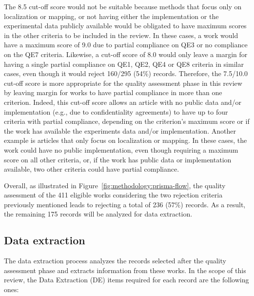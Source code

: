 The 8.5 cut-off score would not be suitable because methods that focus only on localization or mapping, or not having either the implementation or the experimental data publicly available would be obligated to have maximum scores in the other criteria to be included in the review. In these cases, a work would have a maximum score of 9.0 due to partial compliance on QE3 or no compliance on the QE7 criteria. Likewise, a cut-off score of 8.0 would only leave a margin for having a single partial compliance on QE1, QE2, QE4 or QE8 criteria in similar cases, even though it would reject 160/295 (54\%) records. Therefore, the 7.5/10.0 cut-off score is more appropriate for the quality assessment phase in this review by leaving margin for works to have partial compliance in more than one criterion. Indeed, this cut-off score allows an article with no public data and/or implementation (e.g., due to confidentiality agreements) to have up to four criteria with partial compliance, depending on the criterion's maximum score or if the work has available the experiments data and/or implementation. Another example is articles that only focus on localization or mapping. In these cases, the work could have no public implementation, even though requiring a maximum score on all other criteria, or, if the work has public data or implementation available, two other criteria could have partial compliance.

Overall, as illustrated in Figure~\ref{fig:methodology:prisma-flow}, the quality assessment of the 411 eligible works considering the two rejection criteria previously mentioned leads to rejecting a total of 236 (57\%) records. As a result, the remaining 175 records will be analyzed for data extraction.

\subsection{Data extraction}
\label{sec:methodology:data}

The data extraction process analyzes the records selected after the quality assessment phase and extracts information from these works. In the scope of this review, the Data Extraction (DE) items required for each record are the following ones:

